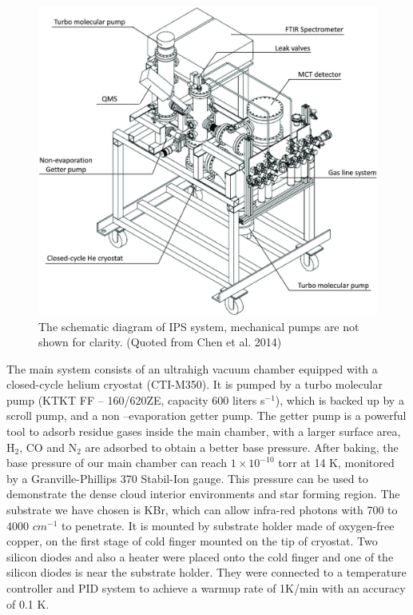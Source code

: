 \begin{figure}
\centering
\includegraphics[width=\textwidth]{figures/chapter2/system.jpg}
\caption{The schematic diagram of IPS system, mechanical pumps are not shown for clarity. (Quoted from Chen et al. 2014)}
\label{fig:system}
\end{figure}

The main system consists of an ultrahigh vacuum chamber equipped with a closed-cycle helium cryostat (CTI-M350). It is pumped by a turbo molecular pump (KTKT FF – 160/620ZE, capacity 600 liters s$^{-1}$), which is backed up by a scroll pump, and a non –evaporation getter pump. The getter pump is a powerful tool to adsorb residue gases inside the main chamber, with a larger surface area, H$_2$, CO and N$_2$ are adsorbed to obtain a better base pressure. After baking, the base pressure of our main chamber can reach $1 \times 10^{-10}$ torr at 14 K, monitored by a Granville-Phillips 370 Stabil-Ion gauge. This pressure can be used to demonstrate the dense cloud interior environments and star forming region. The substrate we have chosen is KBr, which can allow infra-red photons with 700 to 4000 $cm^{-1}$ to penetrate. It is mounted by substrate holder made of oxygen-free copper, on the first stage of cold finger mounted on the tip of cryostat. Two silicon diodes and also a heater were placed onto the cold finger and one of the silicon diodes is near the substrate holder. They were connected to a temperature controller and PID system to achieve a warmup rate of 1K/min with an accuracy of 0.1 K.


